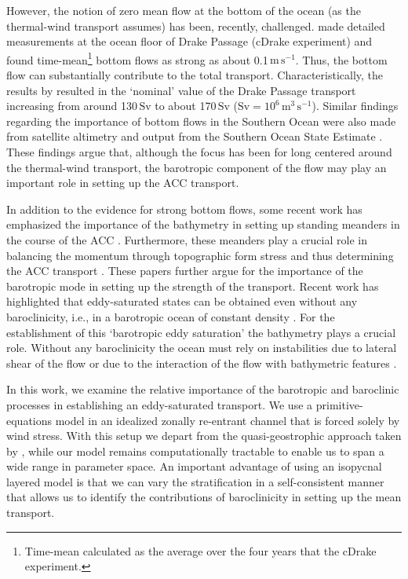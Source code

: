 \documentclass{agujournal2019}
\begin{document}
However, the notion of zero mean flow at the bottom of the ocean (as the thermal-wind transport assumes) has been, recently, challenged.  made detailed measurements at the ocean floor of Drake Passage (cDrake experiment) and found time-mean\footnote{Time-mean calculated as the average over the four years that the cDrake experiment.} bottom flows as strong as about 0.1$\,\text{m}\,\text{s}^{-1}$. Thus, the bottom flow can substantially contribute to the total transport. Characteristically, the results by  resulted in the `nominal' value of the Drake Passage transport increasing from around 130$\,\text{Sv}$ to about 170$\,\text{Sv}$ ($\text{Sv}=10^6\,\text{m}^3\,\text{s}^{-1}$).  Similar findings regarding the importance of bottom flows in the Southern Ocean were also made from satellite altimetry and output from the Southern Ocean State Estimate \cite{Rintoul-etal-2014, PenaMolino-etal-2014, Masich-etal-2015}. These findings argue that, although the focus has been for long centered around the thermal-wind transport, the barotropic component of the flow may play an important role in setting up the ACC transport. 

In addition to the evidence for strong bottom flows, some recent work has emphasized the importance of the bathymetry in setting up standing meanders in the course of the ACC \cite{Youngs-etal-2017, Barthel-etal-2017}. Furthermore, these meanders play a crucial role in balancing the momentum through topographic form stress and thus determining the ACC transport \cite{Thompson-NaveiraGarabato-2014,Katsumata-2017}. These papers further argue for the importance of the barotropic mode in setting up the strength of the transport. Recent work has highlighted that eddy-saturated states can be obtained even without any baroclinicity, i.e., in a barotropic ocean of constant density \cite{Constantinou-Young-2017, Constantinou-2018}. For the establishment of this `barotropic eddy saturation' the bathymetry plays a crucial role. Without any baroclinicity the ocean must rely on instabilities due to lateral shear of the flow or due to the interaction of the flow with bathymetric features \cite{Hart-1979, Charney-Flierl-1980}. 

In this work, we examine the relative importance of the barotropic and baroclinic processes in establishing an eddy-saturated transport. We use a primitive-equations model in an idealized zonally re-entrant channel that is forced solely by wind stress.  With this setup we depart from the quasi-geostrophic approach taken by , while our model remains computationally tractable  to enable us to span a wide range in parameter space. An important advantage of using an isopycnal layered model is that we can vary the stratification in a self-consistent manner that allows us to identify the contributions of baroclinicity in setting up the mean transport.
\end{document}
